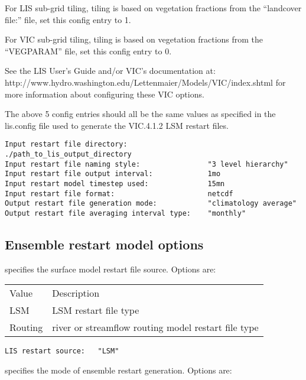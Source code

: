  For LIS sub-grid tiling, tiling is based on vegetation fractions
 from the ``landcover file:'' file, set this config entry to 1.

 For VIC sub-grid tiling, tiling is based on vegetation fractions
 from the ``VEGPARAM'' file, set this config entry to 0.

 See the LIS User's Guide and/or VIC's documentation at:
 http://www.hydro.washington.edu/Lettenmaier/Models/VIC/index.shtml
 for more information about configuring these VIC options.

 The above 5 config entries should all be the same values as specified in
 the lis.config file used to generate the VIC.4.1.2 LSM restart files.
 

 \begin{Verbatim}[frame=single]
Input restart file directory:                   ./path_to_lis_output_directory
Input restart file naming style:                "3 level hierarchy"
Input restart file output interval:             1mo
Input restart model timestep used:              15mn
Input restart file format:                      netcdf
Output restart file generation mode:            "climatology average"
Output restart file averaging interval type:    "monthly"
 \end{Verbatim}


 
 \subsection{Ensemble restart model options} \label{ssec:ensrstopts}
 


 
 specifies the surface model restart file source. Options are:

 \begin{tabular}{ll}
 Value     & Description                   \\
 LSM       & LSM restart file type         \\ 
 Routing   & river or streamflow routing 
             model restart file type       \\
 \end{tabular}
 

 \begin{Verbatim}[frame=single]
LIS restart source:   "LSM"
 \end{Verbatim}

 
 specifies the mode of ensemble restart generation. Options are:

